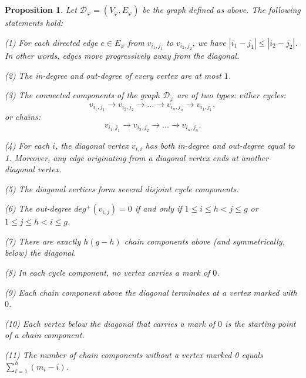 \documentclass[a4paper,12pt,twoside]{report}
\newtheorem{proposition}[theorem]{Proposition}
\begin{document}
\begin{proposition}
    Let $\mathcal{D}_{\varphi}=(V_{\varphi},E_{\varphi})$ be the graph defined as above. The following statements hold: 

    {\rm(1)} For each directed edge $e\in E_{\varphi}$ from $v_{i_1,j_1}$ to $v_{i_2,j_2}$, we have $|i_1-j_1|\leqslant |i_2-j_2|$. 
    In other words, edges move progressively away from the diagonal.

    {\rm(2)} The in-degree and out-degree of every vertex are at most $1$.

    {\rm(3)} The connected components of the graph $\mathcal{D}_{\varphi}$ are of two types: either cycles: 
    \[v_{i_1,j_1}\rightarrow v_{i_2,j_2}\rightarrow... \rightarrow v_{i_n,j_n}\rightarrow v_{i_1,j_1},\] 
    or chains: 
    \[v_{i_1,j_1}\rightarrow v_{i_2,j_2}\rightarrow... \rightarrow v_{i_n,j_n}.\]


    {\rm(4)} For each $i$, the diagonal vertex $v_{i,i}$ has both in-degree and out-degree equal to 1. 
    Moreover, any edge originating from a diagonal vertex ends at another diagonal vertex.

    {\rm(5)}  The diagonal vertices form several disjoint cycle components.

    {\rm(6)} The out-degree $deg^+(v_{i,j})=0$ if and only if 
    $1\leqslant i \leqslant h < j\leqslant g$ or $1\leqslant j \leqslant h < i\leqslant g$. 

    {\rm(7)} There are exactly $h(g-h)$ chain components above (and symmetrically, below) the diagonal. 

    {\rm(8)} In each cycle component, no vertex carries a mark of $0$.  

    {\rm(9)} Each chain component above the diagonal terminates at a vertex marked with $0$.

    {\rm(10)} Each vertex below the diagonal that carries a mark of $0$ is the starting point of a chain component.

    {\rm(11)} The number of chain components without a vertex marked 0 equals $\sum_{i=1}^h(m_i-i)$. 
\end{proposition}
\end{document}
